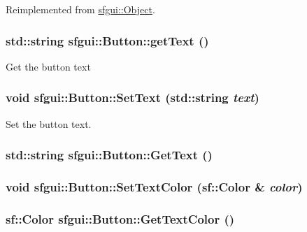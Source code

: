 Reimplemented from \hyperlink{classsfgui_1_1Object_d2750b3d51a3a208739ed6c0c57df6aa}{sfgui::Object}.\hypertarget{classsfgui_1_1Button_015166159ef486c5001c5b58e79abc2d}{
\subsubsection[getText]{\setlength{\rightskip}{0pt plus 5cm}std::string sfgui::Button::getText ()}}
\label{classsfgui_1_1Button_015166159ef486c5001c5b58e79abc2d}




Get the button text \hypertarget{classsfgui_1_1Button_48ddf97b9a9f77517f5bf70e93df2b80}{
\subsubsection[SetText]{\setlength{\rightskip}{0pt plus 5cm}void sfgui::Button::SetText (std::string {\em text})}}
\label{classsfgui_1_1Button_48ddf97b9a9f77517f5bf70e93df2b80}




Set the button text. \hypertarget{classsfgui_1_1Button_f731f8fe61ce30a7e405d8d3a56c5f22}{
\subsubsection[GetText]{\setlength{\rightskip}{0pt plus 5cm}std::string sfgui::Button::GetText ()}}
\label{classsfgui_1_1Button_f731f8fe61ce30a7e405d8d3a56c5f22}


\hypertarget{classsfgui_1_1Button_af73ff1983944ea0969bf5c7421725c5}{
\subsubsection[SetTextColor]{\setlength{\rightskip}{0pt plus 5cm}void sfgui::Button::SetTextColor (sf::Color \& {\em color})}}
\label{classsfgui_1_1Button_af73ff1983944ea0969bf5c7421725c5}


\hypertarget{classsfgui_1_1Button_7eca4b2322ce0785e64bd2932912b974}{
\subsubsection[GetTextColor]{\setlength{\rightskip}{0pt plus 5cm}sf::Color sfgui::Button::GetTextColor ()}}
\label{classsfgui_1_1Button_7eca4b2322ce0785e64bd2932912b974}



